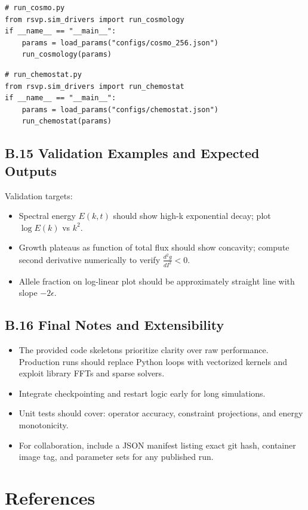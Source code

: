 \documentclass[11pt,a4paper]{article}
\begin{document}
\begin{verbatim}
# run_cosmo.py
from rsvp.sim_drivers import run_cosmology
if __name__ == "__main__":
    params = load_params("configs/cosmo_256.json")
    run_cosmology(params)
\end{verbatim}

\begin{verbatim}
# run_chemostat.py
from rsvp.sim_drivers import run_chemostat
if __name__ == "__main__":
    params = load_params("configs/chemostat.json")
    run_chemostat(params)
\end{verbatim}

\subsection{B.15 Validation Examples and Expected Outputs}

Validation targets:

\begin{itemize}
  \item Spectral energy \(E(k,t)\) should show high-k exponential decay; plot \(\log E(k)\) vs \(k^2\).
  \item Growth plateaus as function of total flux should show concavity; compute second derivative numerically to verify \(\frac{d^2 g}{dI^2} < 0\).
  \item Allele fraction on log-linear plot should be approximately straight line with slope \(-2\epsilon\).
\end{itemize}

\subsection{B.16 Final Notes and Extensibility}

\begin{itemize}
  \item The provided code skeletons prioritize clarity over raw performance. Production runs should replace Python loops with vectorized kernels and exploit library FFTs and sparse solvers.
  \item Integrate checkpointing and restart logic early for long simulations.
  \item Unit tests should cover: operator accuracy, constraint projections, and energy monotonicity.
  \item For collaboration, include a JSON manifest listing exact git hash, container image tag, and parameter sets for any published run.
\end{itemize}



\section*{References}

\nocite{Boltzmann1877,Gibbs1902,Hamilton1834,Kimura1968,Brezis1973,Evans1998,Boyd2004}



\end{document}
